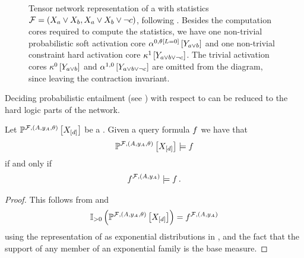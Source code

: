 \begin{figure}[t]
    \begin{center}
        
    \end{center}
    \caption{Tensor network representation of a \HybridLogicNetwork{} with statistics $\mathcal{F}=(X_{a}\lor X_{b},X_{a}\lor X_{b}\lor \lnot c)$, following .
    Besides the computation cores required to compute the statistics, we have one non-trivial \textcolor{\probcolor}{probabilistic soft activation core $\alpha^{0,\theta\left[L=0\right]}\left[Y_{a\lor b}\right]$} and one non-trivial \textcolor{\concolor}{constraint hard activation core $\kappa^{1}\left[Y_{a\lor b \lor \lnot c}\right]$}.
    The trivial activation cores $\kappa^{0}\left[Y_{a\lor b}\right]$ and $\alpha^{1,0}\left[Y_{a\lor b \lor \lnot c}\right]$ are omitted from the diagram, since leaving the contraction invariant.}
    \label{fig:hlnRepresentationExample}
\end{figure}


Deciding probabilistic entailment (see ) with respect to \HybridLogicNetworks{} can be reduced to the hard logic parts of the network.

\begin{theorem}
    \label{the:hlnEntailmentReduction}
    Let $\mathbb{P}^{\mathcal{F},(A,y_{A},\theta)}\left[X_{[d]}\right]$ be a \HybridLogicNetwork{}.
    Given a query formula $f$ we have that
    \begin{align*}
        \mathbb{P}^{\mathcal{F},(A,y_{A},\theta)}\left[X_{[d]}\right] \models f
    \end{align*}
    if and only if
    \begin{align*}
        f^{\mathcal{F},(A,y_{A})} \models f \, .
    \end{align*}
\end{theorem}
\begin{proof}
    This follows from  and
    \begin{align*}
        \mathbb{I}_{>0}\left(\mathbb{P}^{\mathcal{F},(A,y_{A},\theta)}\left[X_{[d]}\right]\right) = f^{\mathcal{F},(A,y_{A})}
    \end{align*}
    using the representation of \HybridLogicNetworks{} as exponential distributions in , and the fact that the support of any member of an exponential family is the base measure.
\end{proof}

